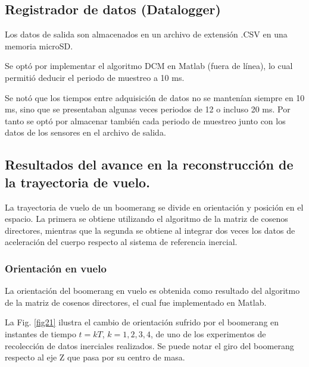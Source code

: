 	\subsection{Registrador de datos (Datalogger)}

Los datos de salida son almacenados en un archivo de extensión .CSV en una memoria microSD.

Se optó por implementar el algoritmo DCM en Matlab (fuera de línea), lo cual permitió deducir el periodo de muestreo a 10 ms.

Se notó que los tiempos entre adquisición de datos no se mantenían siempre en 10 ms, sino que se presentaban algunas veces periodos de 12 o incluso 20 ms. Por tanto se optó por almacenar también cada periodo de muestreo junto con los datos de los sensores en el archivo de salida.

	\subsection{Resultados del avance en la reconstrucción de la trayectoria de vuelo.}

	La trayectoria de vuelo de un boomerang se divide en orientación y posición en el espacio. La primera se obtiene utilizando el algoritmo de la matriz de cosenos directores, mientras que la segunda se obtiene al integrar dos veces los datos de aceleración del cuerpo respecto al sistema de referencia inercial.

	\subsubsection{Orientación en vuelo}

	La orientación del boomerang en vuelo es obtenida como resultado del algoritmo de la matriz de cosenos directores, el cual fue implementado en Matlab.

	La Fig. \ref{fig21} ilustra el cambio de orientación sufrido por el boomerang en instantes de tiempo $t = kT$, $k = {1, 2, 3, 4}$, de uno de los experimentos de recolección de datos inerciales realizados. Se puede notar el giro del boomerang respecto al eje Z que pasa por su centro de masa.

